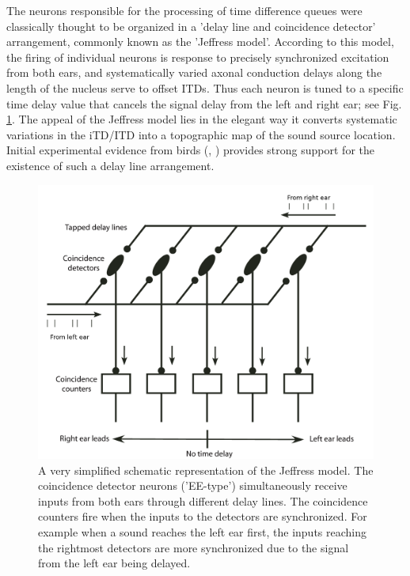 The neurons responsible for 
the processing of time difference queues were classically thought to be organized in a 'delay line and coincidence detector' arrangement, commonly
known as the 'Jeffress model'\cite{jeffressmodel}. According to this model, the firing of individual neurons is response to precisely synchronized excitation
from both ears, and systematically varied axonal conduction delays along the length of the nucleus serve to offset ITDs. Thus each neuron is tuned to a 
specific time delay value that cancels the signal delay from the left and right ear; see Fig. \ref{jeffressmodel}. The appeal of the Jeffress model lies in the elegant way it converts systematic variations in the iTD/ITD into
a topographic map of the sound source location. Initial experimental evidence from birds (\cite{carrkonishi}, \cite{parksrubel}) provides strong support 
for the existence of such a delay line arrangement.
\begin{figure}[ht!]
 \centering
 \includegraphics[width=0.6\linewidth]{Diagrams/Jeffress.png}
 \caption[Delay line coincidence detector - Jeffress model]{A very simplified schematic representation of the Jeffress model. The coincidence detector neurons ('EE-type')
 simultaneously receive inputs from both ears through different delay lines. The coincidence counters fire when the inputs to the detectors are synchronized. For
 example when a sound reaches the left ear first, the inputs reaching the rightmost detectors are more synchronized due to the signal from the left ear being
 delayed.}
 \label{jeffressmodel}
\end{figure}

